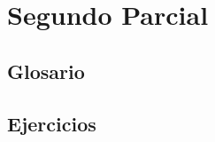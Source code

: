 \documentclass{book}
\begin{document}
\chapter{Segundo Parcial}
\section{Glosario}
\section{Ejercicios}
\end{document}

